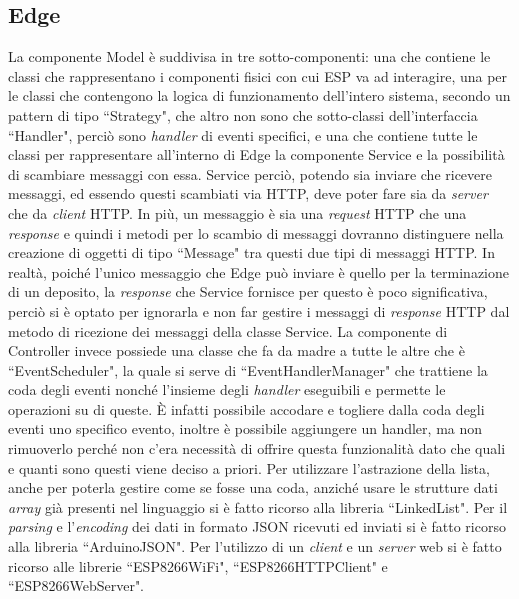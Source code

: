\documentclass[a4paper, 12pt]{report}
\begin{document}
			\subsection{Edge}
			La componente Model è suddivisa in tre sotto-componenti: una che contiene le classi che
			rappresentano i componenti fisici con cui ESP va ad interagire, una per le classi che
			contengono la logica di funzionamento dell'intero sistema, secondo un pattern di tipo
			``Strategy", che altro non sono che sotto-classi dell'interfaccia ``Handler", perciò sono
			\textit{handler} di eventi specifici, e una che contiene tutte le classi per rappresentare
			all'interno di Edge la componente Service e la possibilità di scambiare messaggi con essa.
			Service perciò, potendo sia inviare che ricevere messaggi, ed essendo questi scambiati via
			HTTP, deve poter fare sia da \textit{server} che da \textit{client} HTTP. In più, un
			messaggio è sia una \textit{request} HTTP che una \textit{response} e quindi i metodi per lo
			scambio di messaggi dovranno distinguere nella creazione di oggetti di tipo ``Message" tra
			questi due tipi di messaggi HTTP. In realtà, poiché l'unico messaggio che Edge può inviare
			è quello per la terminazione di un deposito, la \textit{response} che Service fornisce per
			questo è poco significativa, perciò si è optato per ignorarla e non far gestire i
			messaggi di \textit{response} HTTP dal metodo di ricezione dei messaggi della classe Service.
			\newline La componente di Controller invece possiede una classe che fa da madre a tutte le
			altre che è ``EventScheduler", la quale si serve di ``EventHandlerManager" che trattiene la
			coda degli eventi nonché l'insieme degli \textit{handler} eseguibili e permette le operazioni
			su di queste. È infatti possibile accodare e togliere dalla coda degli eventi uno specifico
			evento, inoltre è possibile aggiungere un handler, ma non rimuoverlo perché non c'era
			necessità di offrire questa funzionalità dato che quali e quanti sono questi viene deciso
			a priori.\newline
			Per utilizzare l'astrazione della lista, anche per poterla gestire come se fosse una coda,
			anziché usare le strutture dati \textit{array} già presenti nel linguaggio si è fatto
			ricorso alla
			libreria ``LinkedList". Per il \textit{parsing} e l'\textit{encoding} dei dati in formato
			JSON ricevuti ed inviati si è fatto ricorso alla libreria ``ArduinoJSON". Per l'utilizzo di
			un \textit{client} e un \textit{server} web si è fatto ricorso alle
			librerie ``ESP8266WiFi", ``ESP8266HTTPClient" e ``ESP8266WebServer".
\end{document}
